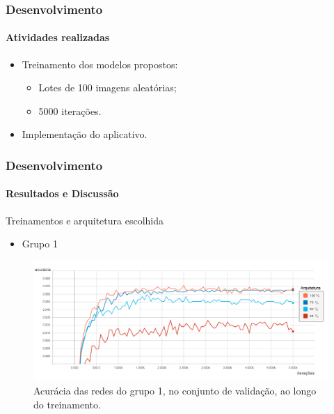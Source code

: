 \documentclass{beamer}
\begin{document}
    \begin{frame}
      \frametitle{Desenvolvimento}
      \framesubtitle{Atividades realizadas}      
      \begin{itemize}
        \item<1-> Treinamento dos modelos propostos: \medskip
		 \begin{itemize}
        		\item<2-> Lotes de 100 imagens aleatórias; \medskip
        		\item<3-> 5000 iterações. \bigskip
		\end{itemize}        
        \item<4-> Implementação do aplicativo.
      \end{itemize}
    \end{frame}
        
    
    \begin{frame}
      \frametitle{Desenvolvimento}
      \framesubtitle{Resultados e Discussão}  \medskip  
      	Treinamentos e arquitetura escolhida \medskip    
      	\begin{itemize}
      		\item Grupo 1
		\end{itemize}      	  	
		\begin{figure}[t]
      		 \begin{minipage}[h]{1.0\linewidth}
         		\centering
      			\includegraphics[height=0.42\linewidth]{img/acc_1_5000.png}
      			\caption{Acurácia das redes do grupo 1, no conjunto de validação, ao longo do treinamento.}
      		\end{minipage}
      		\vspace{0.00mm}
      	\end{figure}	      	       
    \end{frame}
    
\end{document}
